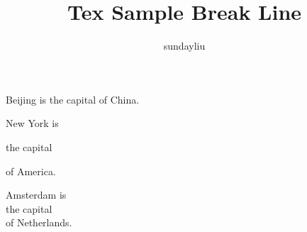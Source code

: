 \documentclass{article}
\author{sundayliu}
\title{Tex Sample Break Line}
\begin{document}
\maketitle
Beijing is
the capital
of China.

New York is

the capital

of America.

Amsterdam is \\ the capital \\
of Netherlands.
\end{document}
